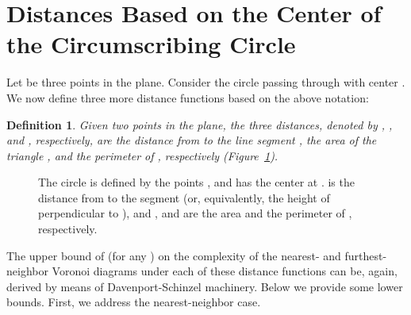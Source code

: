 \documentclass[10pt, conference, compsocconf]{IEEEtran}
\newtheorem{definition}{Definition}
\begin{document}
\section{Distances Based on the Center of the Circumscribing Circle}

Let  be three points in the plane. Consider the circle 
passing through  with center .
We now define three more distance functions based on the above notation:
\begin{definition}
   Given two points  in the plane, the three distances, denoted by
   , , and , respectively, are
   the distance from  to the line segment , the area of the
   triangle , and the perimeter of
   , respectively (Figure~\ref{fig:circ-based}).
\end{definition}

   \begin{figure}
\centering
{}
      \caption{The circle  is defined by the points ,
               and has the center at .   is the
               distance from  to the segment  (or,
               equivalently, the height of 
               perpendicular to ), and , and
                are the area and the perimeter of , respectively.}
      \label{fig:circ-based}
   \end{figure}

The upper bound of  (for any ) on the complexity of
the nearest- and furthest-neighbor Voronoi diagrams under each of these
distance functions can be, again, derived by means of Davenport-Schinzel
machinery.  Below we provide some lower bounds.  First, we address the
nearest-neighbor case.
\end{document}
